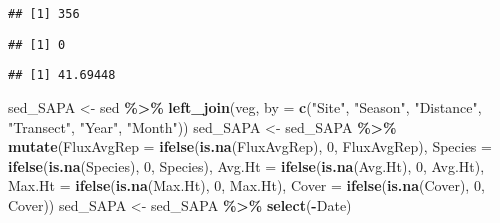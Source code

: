 \documentclass[
]{article}
\newenvironment{Shaded}{\begin{snugshade}}{\end{snugshade}}
\newcommand{\AttributeTok}[1]{\textcolor[rgb]{0.13,0.29,0.53}{#1}}
\newcommand{\ConstantTok}[1]{\textcolor[rgb]{0.56,0.35,0.01}{#1}}
\newcommand{\DecValTok}[1]{\textcolor[rgb]{0.00,0.00,0.81}{#1}}
\newcommand{\FunctionTok}[1]{\textcolor[rgb]{0.13,0.29,0.53}{\textbf{#1}}}
\newcommand{\NormalTok}[1]{#1}
\newcommand{\OtherTok}[1]{\textcolor[rgb]{0.56,0.35,0.01}{#1}}
\newcommand{\SpecialCharTok}[1]{\textcolor[rgb]{0.81,0.36,0.00}{\textbf{#1}}}
\newcommand{\StringTok}[1]{\textcolor[rgb]{0.31,0.60,0.02}{#1}}
\begin{document}
\begin{verbatim}
## [1] 356
\end{verbatim}

\begin{Shaded}
\end{Shaded}

\begin{verbatim}
## [1] 0
\end{verbatim}

\begin{Shaded}
\end{Shaded}

\begin{verbatim}
## [1] 41.69448
\end{verbatim}

\begin{Shaded}
\begin{Highlighting}[]
\NormalTok{sed\_SAPA }\OtherTok{\textless{}{-}}\NormalTok{ sed }\SpecialCharTok{\%\textgreater{}\%} \FunctionTok{left\_join}\NormalTok{(veg, }\AttributeTok{by =} \FunctionTok{c}\NormalTok{(}\StringTok{"Site"}\NormalTok{, }\StringTok{"Season"}\NormalTok{, }\StringTok{"Distance"}\NormalTok{, }\StringTok{"Transect"}\NormalTok{, }\StringTok{"Year"}\NormalTok{, }\StringTok{"Month"}\NormalTok{))}
\NormalTok{sed\_SAPA }\OtherTok{\textless{}{-}}\NormalTok{ sed\_SAPA }\SpecialCharTok{\%\textgreater{}\%}
  \FunctionTok{mutate}\NormalTok{(}\AttributeTok{FluxAvgRep =} \FunctionTok{ifelse}\NormalTok{(}\FunctionTok{is.na}\NormalTok{(FluxAvgRep), }\DecValTok{0}\NormalTok{, FluxAvgRep),}
        \AttributeTok{Species =} \FunctionTok{ifelse}\NormalTok{(}\FunctionTok{is.na}\NormalTok{(Species), }\DecValTok{0}\NormalTok{, Species), }
        \AttributeTok{Avg.Ht =} \FunctionTok{ifelse}\NormalTok{(}\FunctionTok{is.na}\NormalTok{(Avg.Ht), }\DecValTok{0}\NormalTok{, Avg.Ht),}
        \AttributeTok{Max.Ht =} \FunctionTok{ifelse}\NormalTok{(}\FunctionTok{is.na}\NormalTok{(Max.Ht), }\DecValTok{0}\NormalTok{, Max.Ht), }
        \AttributeTok{Cover =} \FunctionTok{ifelse}\NormalTok{(}\FunctionTok{is.na}\NormalTok{(Cover), }\DecValTok{0}\NormalTok{, Cover))}
\NormalTok{sed\_SAPA }\OtherTok{\textless{}{-}}\NormalTok{ sed\_SAPA }\SpecialCharTok{\%\textgreater{}\%}
  \FunctionTok{select}\NormalTok{(}\SpecialCharTok{{-}}\NormalTok{Date)}
\end{Highlighting}
\end{Shaded}
\end{document}
